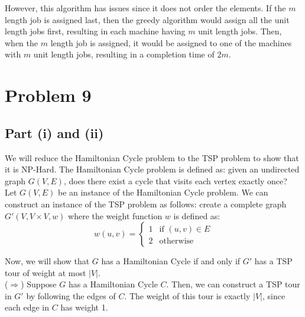 \documentclass[a4paper]{article}
\begin{document}
\noindent
However, this algorithm has issues since it does not order the elements. If the $m$ length job is assigned last, then the greedy algorithm would assign all the unit length jobs first, resulting in each machine having $m$ unit length jobs. Then, when the $m$ length job is assigned, it would be assigned to one of the machines with $m$ unit length jobs, resulting in a completion time of $2m$. 



\newpage
\section*{Problem 9}

\subsection*{Part (i) and (ii)}
We will reduce the Hamiltonian Cycle problem to the TSP problem to show that it is NP-Hard. The Hamiltonian Cycle problem is defined as: given an undirected graph $G(V, E)$, does there exist a cycle that visits each vertex exactly once?\\

\noindent
Let $G(V, E)$ be an instance of the Hamiltonian Cycle problem. We can construct an instance of the TSP problem as follows: create a complete graph $G'(V, V \times V, w)$ where the weight function $w$ is defined as:
\[w(u, v) = \begin{cases} 1 & \text{if } (u, v) \in E \\ 2 & \text{otherwise} \end{cases}\]

\noindent
Now, we will show that $G$ has a Hamiltonian Cycle if and only if $G'$ has a TSP tour of weight at most $|V|$.\\

\noindent
($\Rightarrow$) Suppose $G$ has a Hamiltonian Cycle $C$. Then, we can construct a TSP tour in $G'$ by following the edges of $C$. The weight of this tour is exactly $|V|$, since each edge in $C$ has weight 1.\\
\end{document}
